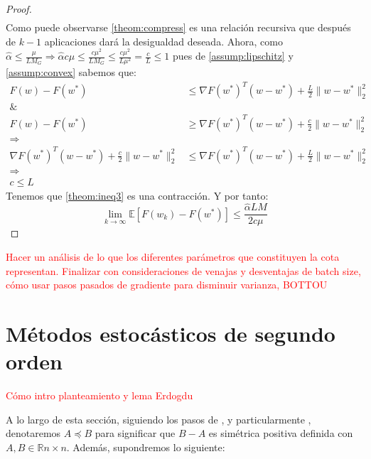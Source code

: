 \documentclass{book}
\theoremstyle{plain}
\theoremstyle{definition}
\theoremstyle{remark}
\begin{document}
\begin{proof}
\begin{equation}
\begin{split}
    \end{split}
\end{equation}
Como puede observarse \ref{theom:compress} es una relación recursiva que después de $k-1$ aplicaciones dará la desigualdad deseada. Ahora, como $\hat{\alpha}\leq\frac{\mu}{L M_G}\Rightarrow \hat{\alpha}c\mu\leq \frac{c\mu^2}{LM_G}\leq\frac{c\mu^2}{L\mu^2}=\frac{c}{L}\leq 1$ pues de \ref{assump:lipschitz} y \ref{assump:convex} sabemos que: 
\begin{equation*}
    \begin{split}
    F(w) - F(w^*) & \leq \nabla F(w^*)^T(w-w^*) + \frac{L}{2}\|w - w^*\|_2^2 \\
    \& & \\
    F(w) - F(w^*) & \geq \nabla F(w^*)^T(w-w^*) +  \frac{c}{2}\|w - w^*\|_2^2 \\
    \Rightarrow & \\
    \nabla F(w^*)^T(w-w^*) + \frac{c}{2}\|w - w^*\|_2^2 &\leq \nabla F(w^*)^T(w-w^*) + \frac{L}{2}\|w - w^*\|_2^2 \\
    \Rightarrow & \\
    c \leq L
    \end{split}
\end{equation*}
Tenemos que \ref{theom:ineq3} es una contracción. Y por tanto: \begin{equation}
    \displaystyle\lim_{k\rightarrow\infty}\mathbb{E}[F(w_k)- F(w^*)] \leq \frac{\hat{\alpha}LM}{2c\mu} 
\end{equation}
\end{proof}

\textcolor{red}{Hacer un análisis de lo que los diferentes parámetros que constituyen la cota representan. Finalizar con consideraciones de venajas y desventajas de batch size, cómo usar pasos pasados de gradiente para disminuir varianza, BOTTOU}


\chapter{Métodos estocásticos de segundo orden}

\newpage

\textcolor{red}{Cómo intro planteamiento y lema Erdogdu}

A lo largo de esta sección, siguiendo los pasos de \cite{BYRD}, \cite{ROOSTA} y particularmente \cite{BOLLAPRAGADA}, denotaremos $A\preceq B$ para significar que $B-A$ es simétrica positiva definida con $A,B \in \mathbb{R}{n\times n}$. Además, supondremos lo siguiente:
\end{document}

